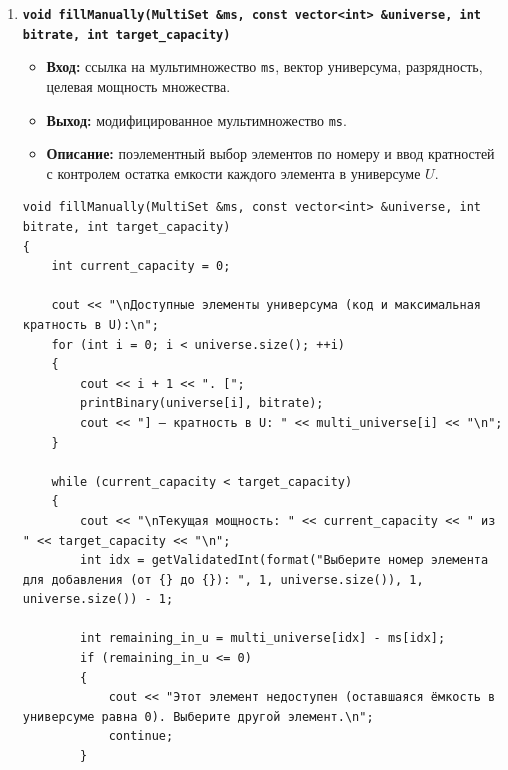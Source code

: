 \documentclass[14pt, a4paper]{extarticle}
\begin{document}
\begin{enumerate}[label=\arabic*., resume]
\begin{lstlisting}[caption={Функция printMultiSet()}, label={lst:func_print_multiset}]
    bool first = true;
    cout << "{";
    int count = 0;
    for (size_t i = 0; count < limit && i < u.size(); ++i)
    {
        if (ms[i] > 0)
        {
            if (!first)
                cout << ", ";
            cout << "'";
            printBinary(u[i], bitrate);
            cout << "': " << ms[i];
            first = false;
            count++;
        }
    }

    if (is_truncated)
    {
        if (!first)
            cout << ", ...";
        else
            cout << "...";
    }
    cout << "}\n";
}
		\end{lstlisting}
		
		\item \textbf{\texttt{void fillManually(MultiSet \&ms, const vector<int> \&universe, int bitrate, int target\_capacity)}}
		\begin{itemize}[leftmargin=*, noitemsep]
			\item \textbf{Вход:} ссылка на мультимножество \texttt{ms}, вектор универсума, разрядность, целевая мощность множества.
			\item \textbf{Выход:} модифицированное мультимножество \texttt{ms}.
			\item \textbf{Описание:} поэлементный выбор элементов по номеру и ввод кратностей с контролем остатка емкости каждого элемента в универсуме $U$.
		\end{itemize}
		\begin{lstlisting}[caption={Функция fillManually()}, label={lst:func_fill_manually}]
void fillManually(MultiSet &ms, const vector<int> &universe, int bitrate, int target_capacity)
{
    int current_capacity = 0;

    cout << "\nДоступные элементы универсума (код и максимальная кратность в U):\n";
    for (int i = 0; i < universe.size(); ++i)
    {
        cout << i + 1 << ". [";
        printBinary(universe[i], bitrate);
        cout << "] — кратность в U: " << multi_universe[i] << "\n";
    }

    while (current_capacity < target_capacity)
    {
        cout << "\nТекущая мощность: " << current_capacity << " из " << target_capacity << "\n";
        int idx = getValidatedInt(format("Выберите номер элемента для добавления (от {} до {}): ", 1, universe.size()), 1, universe.size()) - 1;

        int remaining_in_u = multi_universe[idx] - ms[idx];
        if (remaining_in_u <= 0)
        {
            cout << "Этот элемент недоступен (оставшаяся ёмкость в универсуме равна 0). Выберите другой элемент.\n";
            continue;
        }


\end{lstlisting}
\end{enumerate}
\end{document}
